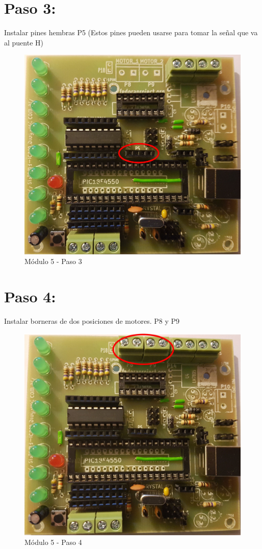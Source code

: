 \newpage

\section{Paso 3:}

Instalar pines hembras P5 (Estos pines pueden usarse para tomar la señal que va al puente H)

\begin{figure}[h]
	\centering
	\includegraphics[width=0.8\linewidth]{Modulo_5/M5_3}
	\caption{Módulo 5 - Paso 3}
	\label{fig:M5_3}
\end{figure}

\newpage

\section{Paso 4:}

Instalar borneras de dos posiciones de motores. P8 y P9

\begin{figure}[h]
	\centering
	\includegraphics[width=0.8\linewidth]{Modulo_5/M5_4}
	\caption{Módulo 5 - Paso 4}
	\label{fig:M5_4}
\end{figure}

